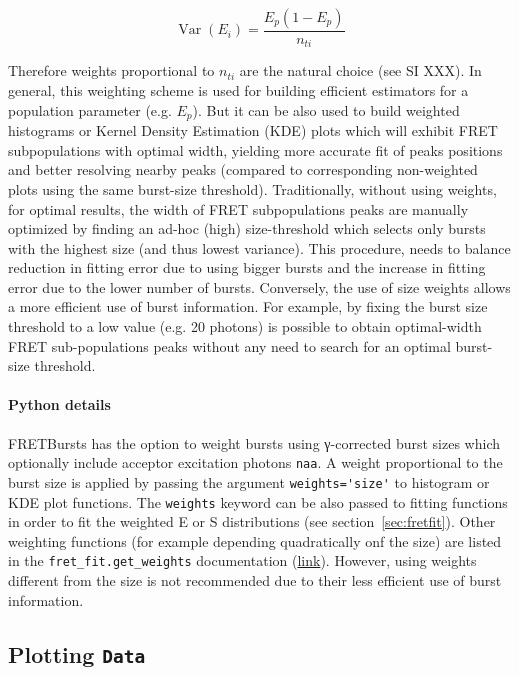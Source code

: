 \begin{equation}
\label{eq:var_e}
\operatorname{Var}\left( E_i \right)
= \frac{E_p(1-E_p)}{n_{ti}}
\end{equation}

Therefore weights proportional to $n_{ti}$ are the natural choice (see SI XXX).
In general, this weighting scheme is used for building efficient estimators for a population
parameter (e.g. $E_p$). But it can be also used to build weighted histograms or Kernel Density
Estimation (KDE) plots which will exhibit FRET subpopulations with optimal width,
yielding more accurate fit of peaks positions and better resolving nearby peaks
(compared to corresponding non-weighted plots using the same burst-size threshold).
Traditionally, without using weights, for optimal results, the width of 
FRET subpopulations peaks are manually optimized by finding an ad-hoc (high) 
size-threshold which selects only bursts with the highest size (and thus lowest variance).
This procedure, needs to balance reduction in fitting error due to using bigger bursts
and the increase in fitting error due to the lower number of bursts.
Conversely, the use of size weights allows a more efficient use of burst information.
For example, by fixing the burst size threshold to a low value (e.g. 20 photons) is possible 
to obtain optimal-width FRET sub-populations peaks without any need to search
for an optimal burst-size threshold.

\paragraph{Python details}
FRETBursts has the option to weight bursts using γ-corrected
burst sizes which optionally include acceptor excitation photons \verb|naa|.
A weight proportional to the burst size is applied by passing the argument
\verb|weights='size'| to histogram or KDE plot functions. The \verb|weights|
keyword can be also passed to fitting functions in order to fit
the weighted E or S distributions (see section~\ref{sec:fretfit}).
Other weighting functions (for example depending quadratically onf the size) 
are listed in the \verb|fret_fit.get_weights| documentation
(\href{http://fretbursts.readthedocs.org/en/latest/fret_fit.html#fretbursts.fret_fit.get_weights}{link}).
However, using weights different from the size is not recommended 
due to their less efficient use of burst information.

\subsection{Plotting \texttt{Data}}
\label{sec:plotting}

